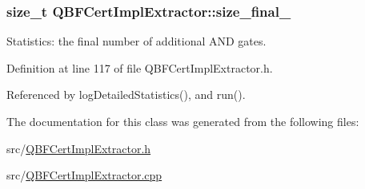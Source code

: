 \hypertarget{classQBFCertImplExtractor_ab22c545849fc2f85a49a846a836a5ec6}{
\subsubsection[{size\-\_\-final\-\_\-}]{\setlength{\rightskip}{0pt plus 5cm}size\-\_\-t Q\-B\-F\-Cert\-Impl\-Extractor\-::size\-\_\-final\-\_\-\hspace{0.3cm}{\ttfamily [protected]}}}\label{classQBFCertImplExtractor_ab22c545849fc2f85a49a846a836a5ec6}


Statistics\-: the final number of additional A\-N\-D gates. 



Definition at line 117 of file Q\-B\-F\-Cert\-Impl\-Extractor.\-h.



Referenced by log\-Detailed\-Statistics(), and run().



The documentation for this class was generated from the following files\-:\begin{DoxyCompactItemize}
\item 
src/\hyperlink{QBFCertImplExtractor_8h}{Q\-B\-F\-Cert\-Impl\-Extractor.\-h}\item 
src/\hyperlink{QBFCertImplExtractor_8cpp}{Q\-B\-F\-Cert\-Impl\-Extractor.\-cpp}\end{DoxyCompactItemize}
